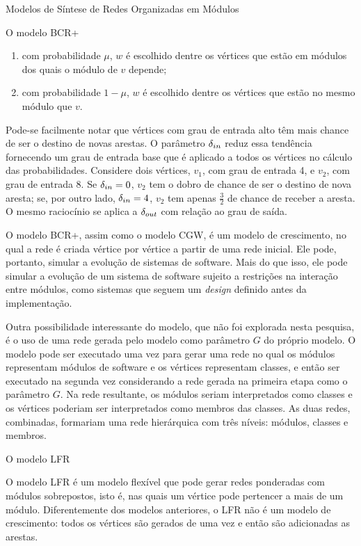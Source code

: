 \begin{section}{Modelos de Síntese de Redes Organizadas em Módulos}
\begin{subsection}{O modelo BCR+}
\begin{enumerate}
\begin{enumerate}
  \item com probabilidade $\mu$, $w$ é escolhido dentre os vértices que estão em módulos dos quais o módulo de $v$ depende;
  \item com probabilidade $1 - \mu$, $w$ é escolhido dentre os vértices que estão no mesmo módulo que $v$.
\end{enumerate}

\end{enumerate}

Pode-se facilmente notar que vértices com grau de entrada alto têm mais chance de ser o destino de novas arestas. O parâmetro $\delta_{in}$ reduz essa tendência fornecendo um grau de entrada base que é aplicado a todos os vértices no cálculo das probabilidades. Considere dois vértices, $v_1$, com grau de entrada 4, e $v_2$, com grau de entrada 8. Se $\delta_{in} = 0$, $v_2$ tem o dobro de chance de ser o destino de nova aresta; se, por outro lado, $\delta_{in} = 4$, $v_2$ tem apenas $\frac{3}{2}$ de chance de receber a aresta. O mesmo raciocínio se aplica a $\delta_{out}$ com relação ao grau de saída.

O modelo BCR+, assim como o modelo CGW, é um modelo de crescimento, no qual a rede é criada vértice por vértice a partir de uma rede inicial. Ele pode, portanto, simular a evolução de sistemas de software. Mais do que isso, ele pode simular a evolução de um sistema de software sujeito a restrições na interação entre módulos, como sistemas que seguem um \emph{design} definido antes da implementação.

Outra possibilidade interessante do modelo, que não foi explorada nesta pesquisa, é o uso de uma rede gerada pelo modelo como parâmetro $G$ do próprio modelo. O modelo pode ser executado uma vez para gerar uma rede no qual os módulos representam módulos de software e os vértices representam classes, e então ser executado na segunda vez considerando a rede gerada na primeira etapa como o parâmetro $G$. Na rede resultante, os módulos seriam interpretados como classes e os vértices poderiam ser interpretados como membros das classes. As duas redes, combinadas, formariam uma rede hierárquica com três níveis: módulos, classes e membros.

\end{subsection}

\begin{subsection}{O modelo LFR}

O modelo LFR \cite{Lancichinetti2009} é um modelo flexível que pode gerar redes ponderadas com módulos sobrepostos, isto é, nas quais um vértice pode pertencer a mais de um módulo. Diferentemente dos modelos anteriores, o LFR não é um modelo de crescimento: todos os vértices são gerados de uma vez e então são adicionadas as arestas.


\end{subsection}
\end{section}
